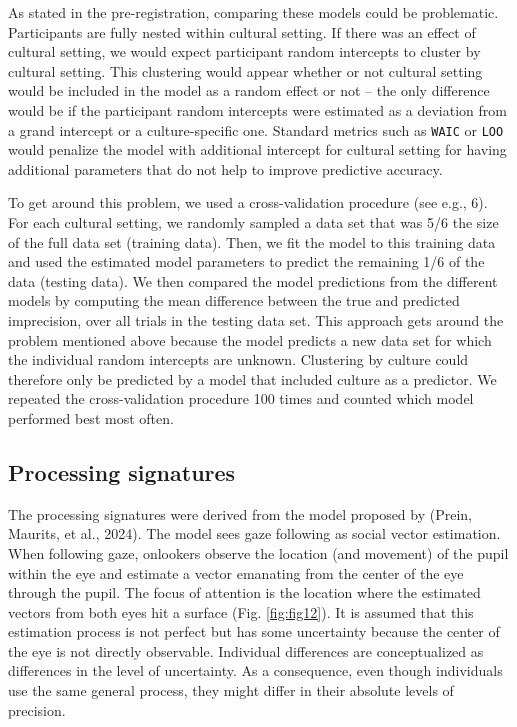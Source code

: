 \documentclass[
  man,floatsintext]{apa7}
\begin{document}
As stated in the pre-registration, comparing these models could be problematic. Participants are fully nested within cultural setting. If there was an effect of cultural setting, we would expect participant random intercepts to cluster by cultural setting. This clustering would appear whether or not cultural setting would be included in the model as a random effect or not -- the only difference would be if the participant random intercepts were estimated as a deviation from a grand intercept or a culture-specific one. Standard metrics such as \texttt{WAIC} or \texttt{LOO} would penalize the model with additional intercept for cultural setting for having additional parameters that do not help to improve predictive accuracy.

To get around this problem, we used a cross-validation procedure (see e.g., 6). For each cultural setting, we randomly sampled a data set that was 5/6 the size of the full data set (training data). Then, we fit the model to this training data and used the estimated model parameters to predict the remaining 1/6 of the data (testing data). We then compared the model predictions from the different models by computing the mean difference between the true and predicted imprecision, over all trials in the testing data set. This approach gets around the problem mentioned above because the model predicts a new data set for which the individual random intercepts are unknown. Clustering by culture could therefore only be predicted by a model that included culture as a predictor. We repeated the cross-validation procedure 100 times and counted which model performed best most often.

\hypertarget{processing-signatures}{%
\subsection{Processing signatures}\label{processing-signatures}}

The processing signatures were derived from the model proposed by (Prein, Maurits, et al., 2024). The model sees gaze following as social vector estimation. When following gaze, onlookers observe the location (and movement) of the pupil within the eye and estimate a vector emanating from the center of the eye through the pupil. The focus of attention is the location where the estimated vectors from both eyes hit a surface (Fig. \ref{fig:fig12}). It is assumed that this estimation process is not perfect but has some uncertainty because the center of the eye is not directly observable. Individual differences are conceptualized as differences in the level of uncertainty. As a consequence, even though individuals use the same general process, they might differ in their absolute levels of precision.
\end{document}
